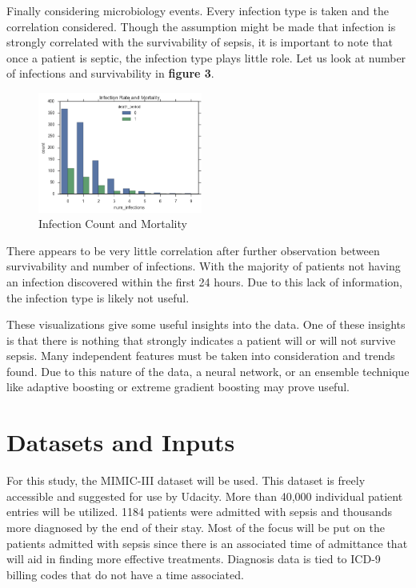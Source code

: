 \documentclass[11pt]{article}
\begin{document}
Finally considering microbiology events. Every infection type is taken and the correlation considered. Though the assumption might be made that infection is strongly correlated with the survivability of sepsis, it is important to note that once a patient is septic, the infection type plays little role. Let us look at number of infections and survivability in \textbf{figure 3}.

\begin{figure}
	\begin{center}
		\includegraphics[width=0.48\textwidth]{bio_graph.png}
	\end{center}
	\caption{Infection Count and Mortality}
\end{figure}

There appears to be very little correlation after further observation between survivability and number of infections. With the majority of patients not having an infection discovered within the first 24 hours. Due to this lack of information, the infection type is likely not useful. 

These visualizations give some useful insights into the data. One of these insights is that there is nothing that strongly indicates a patient will or will not survive sepsis. Many independent features must be taken into consideration and trends found. Due to this nature of the data, a neural network, or an ensemble technique like adaptive boosting or extreme gradient boosting may prove useful. 

\section{Datasets and Inputs}
For this study, the MIMIC-III dataset will be used. This dataset is freely accessible and suggested for use by Udacity. More than 40,000 individual patient entries will be utilized. 1184 patients were admitted with sepsis and thousands more diagnosed by the end of their stay. Most of the focus will be put on the patients admitted with sepsis since there is an associated time of admittance that will aid in finding more effective treatments. Diagnosis data is tied to ICD-9 billing codes that do not have a time associated.
\end{document}
